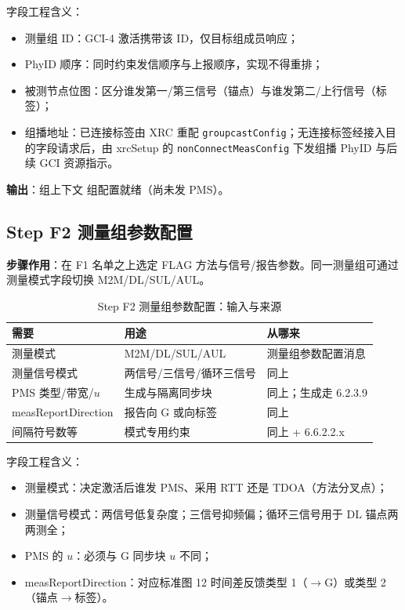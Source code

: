 \documentclass[11pt,a4paper]{ctexart}
\begin{document}
字段工程含义：
\begin{itemize}[nosep]
  \item 测量组 ID：GCI-4 激活携带该 ID，仅目标组成员响应；
  \item PhyID 顺序：同时约束发信顺序与上报顺序，实现不得重排；
  \item 被测节点位图：区分谁发第一/第三信号（锚点）与谁发第二/上行信号（标签）；
  \item 组播地址：已连接标签由 XRC 重配 \texttt{groupcastConfig}；无连接标签经接入目的字段请求后，由 xrcSetup 的 \texttt{nonConnectMeasConfig} 下发组播 PhyID 与后续 GCI 资源指示。
\end{itemize}

\textbf{输出}：组上下文 组配置就绪（尚未发 PMS）。

\subsection{Step F2 测量组参数配置}

\textbf{步骤作用}：在 F1 名单之上选定 FLAG 方法与信号/报告参数。同一测量组可通过测量模式字段切换 M2M/DL/SUL/AUL。

\begin{longtable}{L{3.2cm}L{5.2cm}L{4.5cm}}
\caption{Step F2 测量组参数配置：输入与来源\label{tab:step106}} \\
\toprule
\textbf{需要} & \textbf{用途} & \textbf{从哪来} \\
\midrule
测量模式 & M2M/DL/SUL/AUL & 测量组参数配置消息 \\
测量信号模式 & 两信号/三信号/循环三信号 & 同上 \\
PMS 类型/带宽/$u$ & 生成与隔离同步块 & 同上；生成走 6.2.3.9 \\
measReportDirection & 报告向 G 或向标签 & 同上 \\
间隔符号数等 & 模式专用约束 & 同上 + 6.6.2.2.x \\
\bottomrule
\end{longtable}

字段工程含义：
\begin{itemize}[nosep]
  \item 测量模式：决定激活后谁发 PMS、采用 RTT 还是 TDOA（方法分叉点）；
  \item 测量信号模式：两信号低复杂度；三信号抑频偏；循环三信号用于 DL 锚点两两测全；
  \item PMS 的 $u$：必须与 G 同步块 $u$ 不同；
  \item measReportDirection：对应标准图 12 时间差反馈类型 1（$\to$G）或类型 2（锚点$\to$标签）。
\end{itemize}
\end{document}
